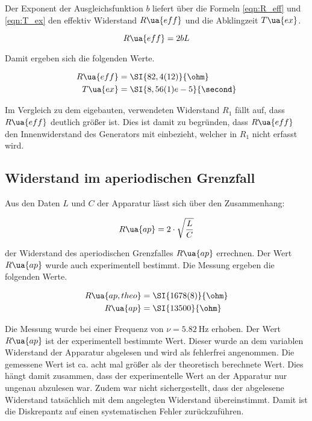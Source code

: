 Der Exponent der Ausgleichsfunktion $b$ liefert über die Formeln
\eqref{eqn:R_eff} und \eqref{eqn:T_ex}
den effektiv Widerstand $R\ua{eff}$ und die Abklingzeit $T\ua{ex}$.

\begin{equation}
  \label{eqn:R_eff}
  R\ua{eff} = 2 b L
\end{equation}

Damit ergeben sich die folgenden Werte.

\begin{align*}
  R\ua{eff} &= \SI{82,4(12)}{\ohm}\\
  T\ua{ex} &= \SI{8,56(1)e-5}{\second}
\end{align*}

Im Vergleich zu dem eigebauten, verwendeten Widerstand $R_1$ fällt auf, dass
$R\ua{eff}$ deutlich größer ist. Dies ist damit zu begründen, dass $R\ua{eff}$
den Innenwiderstand des Generators mit einbezieht, welcher in $R_1$ nicht erfasst
wird.

\subsection{Widerstand im aperiodischen Grenzfall}

Aus den Daten $L$ und $C$ der Apparatur lässt sich über den Zusammenhang:

\begin{equation*}
  R\ua{ap} = 2\cdot \sqrt{\frac{L}{C}}
\end{equation*}

der Widerstand des aperiodischen Grenzfalles $R\ua{ap}$ errechnen.
Der Wert $R\ua{ap}$ wurde auch experimentell bestimmt. Die Messung ergeben
die folgenden Werte.

\begin{align*}
  R\ua{ap,theo} &= \SI{1678(8)}{\ohm}\\
  R\ua{ap} &= \SI{13500}{\ohm}
\end{align*}

Die Messung wurde bei einer Frequenz von $\nu = \SI{5,82}{\hertz}$ erhoben.
Der Wert $R\ua{ap}$ ist der experimentell bestimmte Wert. Dieser wurde an
dem variablen Widerstand der Apparatur abgelesen und wird als fehlerfrei
angenommen. Die gemessene Wert ist ca. acht mal größer als der
theoretisch berechnete Wert. Dies hängt damit zusammen, dass der experimentelle
Wert an der Apparatur nur ungenau abzulesen war. Zudem war nicht sichergestellt,
dass der abgelesene Widerstand tatsächlich mit dem angelegten Widerstand
übereinstimmt. Damit ist die Diskrepantz auf einen systematischen
Fehler zurückzuführen.


